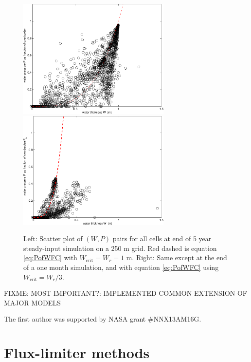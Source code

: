 \documentclass[gmd]{copernicus}   %
\newcommand{\text}{\textrm}
\begin{document}
\begin{figure}[ht]
\includegraphics[width=3.0in,keepaspectratio=true]{isPofW-250m} \,
\includegraphics[width=3.0in,keepaspectratio=true]{isPofW-250m-month}
\caption{Left: Scatter plot of $(W,P)$ pairs for all cells at end of 5 year steady-input simulation on a 250 m grid.  Red dashed is equation \eqref{eq:PofWFC} with $W_{\text{crit}} = W_r = 1$ m.  Right: Same except at the end of a one month simulation, and with equation \eqref{eq:PofWFC} using $W_{\text{crit}} = W_r / 3$.}
\label{fig:isPofWnbreen}
\end{figure}


\conclusions  \label{sec:conclusion}

FIXME:  MOST IMPORTANT?:  IMPLEMENTED COMMON EXTENSION OF MAJOR MODELS


\begin{acknowledgements}
The first author was supported by NASA grant \#NNX13AM16G.  
\end{acknowledgements}





\appendix

\section{Flux-limiter methods} \label{app:fluxlimiters}
\end{document}
